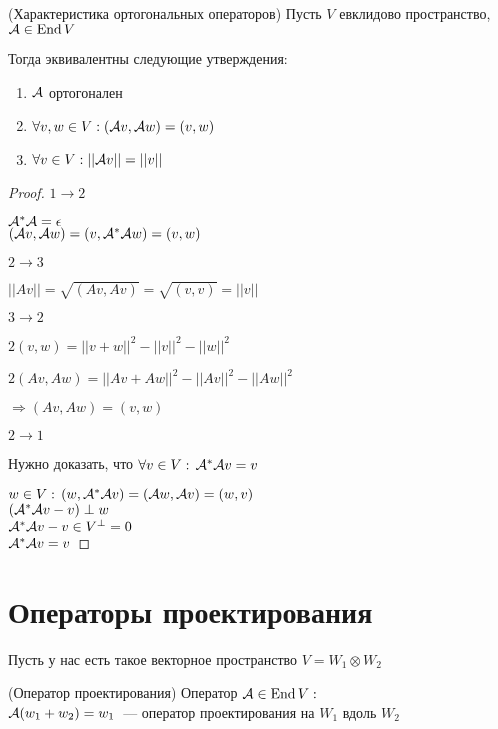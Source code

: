 \begin{theorem}(Характеристика ортогональных операторов)
    Пусть $V$ евклидово пространство, $\mathcal{A} \in \operatorname{End}{V}$ 

    Тогда эквивалентны следующие утверждения:
    \begin{enumerate}
        \item $\mathcal{A}$ ортогонален
        \item $\forall v, w \in V: (\mathcal{A} v, \mathcal{A} w) = (v, w)$
        \item $\forall v \in V: ||\mathcal{A} v|| = || v || $
    \end{enumerate}
    \begin{proof}
        $1 \to 2$

        $\mathcal{A}^* \mathcal{A} = \epsilon$ \\ %
        $(\mathcal{A} v, \mathcal{A} w) = (v, \mathcal{A}^*\mathcal{A} w) = (v, w)$

        $2 \to 3 $

        $||Av|| = \sqrt{(Av, Av)} = \sqrt{(v, v)} = ||v||$

        $3 \to 2$
        
        $2(v, w) = ||v + w||^2 - ||v||^2 - ||w||^2$

        $2(Av, Aw) = ||Av + Aw||^2 - ||Av||^2 - ||Aw||^2$
        
        $\Longrightarrow (Av, Aw) = (v, w)$

        $2 \to 1$

        Нужно доказать, что $\forall v \in V: \, \mathcal{A}^* \mathcal{A} v = v$

        $w \in V: \, (w, \mathcal{A}^* \mathcal{A} v) = (\mathcal{A} w, \mathcal{A} v) = (w, v)$ \\
        $(\mathcal{A}^* \mathcal{A} v - v) \perp w$ \\
        $\mathcal{A}^* \mathcal{A} v - v \in V^{\perp} = 0$ \\
        $\mathcal{A}^* \mathcal{A} v = v$
    \end{proof}    
\end{theorem}


\section*{Операторы проектирования}

Пусть у нас есть такое векторное пространство $V = W_1 \otimes W_2$

\begin{conj}(Оператор проектирования)
    Оператор $\mathcal{A} \in \operatorname{End}{V}:$ \\
    $\mathcal{A}(w_1 + w_2) = w_1$~--- оператор проектирования на $W_1$ вдоль $W_2$
\end{conj}


